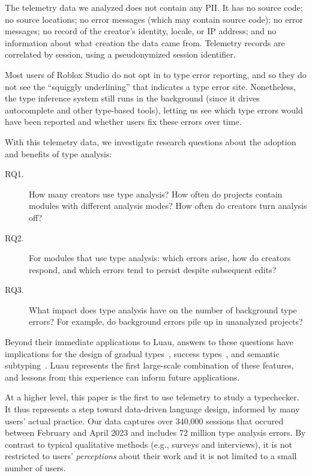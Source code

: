 \documentclass[english,submission,cleveref]{programming}
\begin{document}
The telemetry data we analyzed does not contain any PII.
It has no source code;
 no source locations;
no error messages (which may contain source code);
no error messages;
no record of the creator's identity, locale, or IP address;
and no information about what creation the data came from.
Telemetry records are correlated by session, using a pseudonymized
session identifier.

Most users of {Roblox Studio} do not opt in to type error
reporting, and so they do not see the ``squiggly underlining'' that
indicates a type error site. Nonetheless, the type inference system
still runs in the background (since it drives autocomplete and other
type-based tools), letting us see which type errors would have
been reported and whether users fix these errors over time.

With this telemetry data, we investigate research questions about
the adoption and benefits of type analysis:
\begin{description}
  \item[RQ1.]
    How many creators use type analysis?
    How often do projects contain modules with different
    analysis modes?
    How often do creators turn analysis off?
  \item[RQ2.]
    For modules that use type analysis:
    which errors arise,
    how do creators respond,
    and which errors tend to persist despite subsequent edits?
  \item[RQ3.]
    What impact does type analysis have on the number of background type
    errors?
    For example, do background errors pile up in unanalyzed projects?
\end{description}

Beyond their immediate applications to {Luau},
answers to these questions have implications for the design
of gradual types~\cite{st-sfp-2006}, success types~\cite{lindahl2006practical},
and semantic subtyping~\cite{CF05:GentleIntroduction,Jef22:SemanticSubtyping}.
Luau represents the first large-scale combination of these features,
and lessons from this experience can inform future applications.

At a higher level, this paper is the first to use telemetry 
to study a typechecker.
It thus represents a step toward data-driven language design,
informed by many users' actual practice.
Our data captures over 340,000 sessions
that occured between February and April 2023
and includes 72 million type analysis errors.
By contrast to typical qualitative methods (e.g., surveys and interviews), it
is not restricted to users' \emph{perceptions} about their work and it is not
limited to a small number of users.
\end{document}
